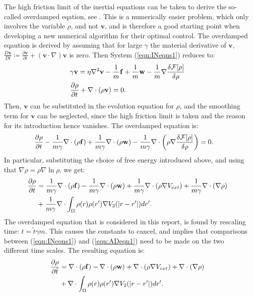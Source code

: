 \documentclass[11pt, a4paper]{article}
\theoremstyle{definition}
\newcommand{\Sta}{\rho}
\newcommand{\Stav}{\mathbf{v}}
\newcommand{\Con}{\mathbf{f}}
\begin{document}
The high friction limit of the inertial equations can be taken to derive the so-called overdamped eqation, see \cite{Archer1}. This is a numerically easier problem, which only involves the variable $\rho$, and not $\Stav$, and is therefore a good starting point when developing a new numerical algorithm for their optimal control. 
The overdamped eqaution is derived by assuming that for large $\gamma$ the material derivative of $\Stav$, $\frac{D \Stav}{D t} \coloneqq  \frac{\partial \Stav}{\partial t} + (\Stav \cdot \nabla)\Stav$ is zero.
Then System (\ref{eqn:INeqns1}) reduces to:
 \begin{align*}
&\gamma \Stav=\eta \nabla^2 \Stav  -\frac{1}{m}\Con +\frac{1}{m}\mathbf{w} - \frac{1}{m}\nabla \frac{\delta \mathcal{F}[\Sta]}{\delta \Sta}\\
 &\frac{\partial \Sta}{\partial t} + \nabla \cdot (\Sta \Stav)=0 \notag.
 \end{align*}
Then, $\Stav$ can be substituted in the evolution equation for $\rho$, and the smoothing term for $\Stav$ can be neglected, since the high friction limit is taken and the reason for its introduction hence vanishes. The overdamped equation is:
  \begin{align*}
 &\frac{\partial \Sta}{\partial t} -\frac{1}{m \gamma}\nabla \cdot (\Sta\Con) +\frac{1}{m \gamma} \nabla \cdot (\Sta \mathbf{w}) - \frac{1}{m \gamma}\nabla \cdot \bigg(\Sta\nabla \frac{\delta \mathcal{F}[\Sta]}{\delta \Sta}\bigg)=0 \notag.
 \end{align*}
 In particular, substituting the choice of free energy introduced above, and using that $\nabla \rho = \rho\nabla \ln \rho$, we get:
\begin{align*}
\frac{\partial \Sta}{\partial t} &= \frac{1}{m \gamma}\nabla \cdot (\Sta\Con) -\frac{1}{m \gamma} \nabla \cdot (\Sta \mathbf{w})  + \frac{1}{m \gamma}\nabla \cdot (\rho\nabla V_{ext}) + \frac{1}{m \gamma}\nabla \cdot (\nabla \rho) \\
&+\frac{1}{m \gamma}\nabla \cdot \int_\Omega \Sta(r)\Sta(r') \nabla V_2(|r-r'|)dr'\notag.
\end{align*}
The overdamped equation that is considered in this report, is found by rescaling time: $t = \tilde t \gamma m$. This causes the constants to cancel, and implies that comparisons between (\ref{eqn:INeqns1}) and (\ref{eqn:ADeqn1}) need to be made on the two different time scales.
The resulting equation is:
\begin{align}
\label{eqn:ADeqn1}
\frac{\partial \Sta}{\partial \tilde t} &= \nabla \cdot (\Sta\Con) - \nabla \cdot (\Sta \mathbf{w})  + \nabla \cdot (\rho\nabla V_{ext}) + \nabla \cdot (\nabla \rho) \\
&+\nabla \cdot \int_\Omega \Sta(r)\Sta(r') \nabla V_2(|r-r'|)dr'. \notag
\end{align}
\end{document}

